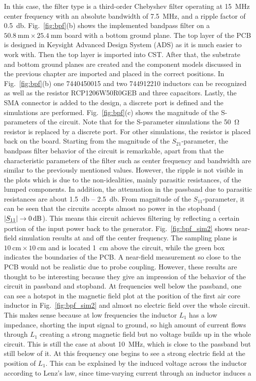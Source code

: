 In this case, the filter type is a third-order Chebyshev filter operating at \SI{15}{\mega\hertz} center frequency with an absolute bandwidth of \SI{7.5}{\mega\hertz}, and a ripple factor of \SI{0.5}{\decibel}. Fig.~\ref{fig:bpf}(b) shows the implemented bandpass filter on a $\SI{50.8}{\milli\meter} \times \SI{25.4}{\milli\meter}$ board with a bottom ground plane. The top layer of the PCB is designed in Keysight Advanced Design System (ADS) as it is much easier to work with. Then the top layer is imported into CST. After that, the substrate and bottom ground planes are created and the component models discussed in the previous chapter are imported and placed in the correct positions. In Fig.~\ref{fig:bpf}(b) one 7440450015 and two 744912210 inductors can be recognized as well as the resistor RCP1206W50R0GEB and three capacitors. Lastly, the SMA connector is added to the design, a discrete port is defined and the simulations are performed. Fig.~\ref{fig:bpf}(c) shows the magnitude of the S-parameters of the circuit. Note that for the S-parameter simulations the \SI{50}{\ohm} resistor is replaced by a discrete port. For other simulations, the resistor is placed back on the board. Starting from the magnitude of the $S_{21}$-parameter, the bandpass filter behavior of the circuit is remarkable, apart from that the characteristic parameters of the filter such as center frequency and bandwidth are similar to the previously mentioned values. However, the ripple is not visible in the plots which is due to the non-idealities, mainly parasitic resistances, of the lumped components. In addition, the attenuation in the passband due to parasitic resistances are about \SI{1.5}{\decibel} -- \SI{2.5}{\decibel}. From magnitude of the $S_{11}$-parameter, it can be seen that the circuits accepts almost no power in the stopband ($\abs{\underline{S_{11}}} \rightarrow \SI{0}{\decibel}$). This means this circuit achieves filtering by reflecting a certain portion of the input power back to the generator. Fig.~\ref{fig:bpf_sim2} shows near-field simulation results at and off the center frequency. The sampling plane is $\SI{10}{\centi\meter} \times \SI{10}{\centi\meter}$ and is located \SI{1}{\centi\meter} above the circuit, while the green box indicates the boundaries of the PCB. A near-field measurement so close to the PCB would not be realistic due to probe coupling. However, these results are thought to be interesting because they give an impression of the behavior of the circuit in passband and stopband. At frequencies well below the passband, one can see a hotspot in the magnetic field plot at the position of the first air core inductor in Fig.~\ref{fig:bpf_sim2} and almost no electric field over the whole circuit. This makes sense because at low frequencies the inductor $L_1$ has a low impedance, shorting the input signal to ground, so high amount of current flows through $L_1$ creating a strong magnetic field but no voltage builds up in the whole circuit. This is still the case at about \SI{10}{\mega\hertz}, which is close to the passband but still below of it. At this frequency one begins to see a strong electric field at the position of $L_1$. This can be explained by the induced voltage across the inductor according to Lenz's law, since time-varying current through an inductor induces a 